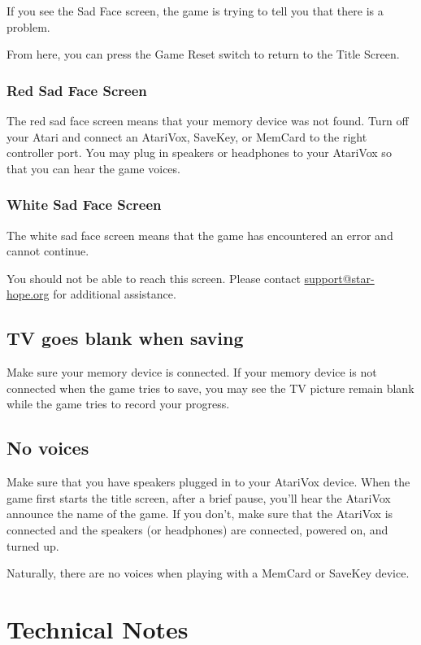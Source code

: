 \documentclass[12pt,openright,book]{memoir}
\begin{document}
\begin{description}
If you  see the Sad  Face screen,  the game is  trying to tell  you that
there is a problem.

From  here,  you can  press  the  Game Reset  switch  to  return to  the
Title Screen.

\subsection{Red Sad Face Screen}

The red  sad face screen  means that your  memory device was  not found.
Turn off your Atari and connect  an AtariVox, SaveKey, or MemCard to the
right controller  port. You may plug  in speakers or headphones  to your
AtariVox so that you can hear the game voices.

\subsection{White Sad Face Screen}

The white sad  face screen means that the game  has encountered an error
and cannot continue. 

You  should   not  be  able   to  reach  this  screen.   Please  contact
\href{mailto:support@star-hope.org}{support@star-hope.org}           for
additional assistance.


\section{TV goes blank when saving}

Make sure your memory device is  connected. If your memory device is not
connected when the game tries to save, you may see the TV picture remain
blank while the game tries to record your progress.

\section{No voices}

Make sure  that you have  speakers plugged  in to your  AtariVox device.
When the game first starts the title screen, after a brief pause, you'll
hear the AtariVox announce the name of the game. If you don't, make sure
that  the AtariVox  is connected  and the  speakers (or  headphones) are
connected, powered on, and turned up.

Naturally,  there  are  no  voices   when  playing  with  a  MemCard  or
SaveKey device. 

\chapter{Technical Notes}


\end{description}
\end{document}

